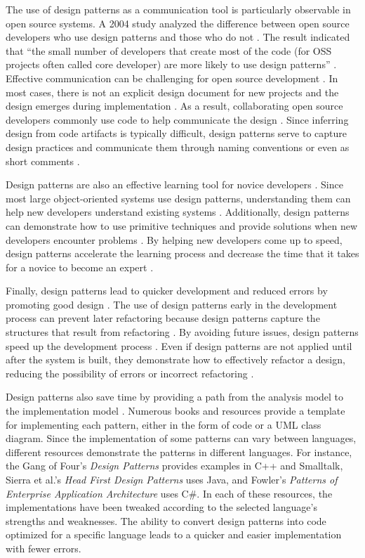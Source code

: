 \documentclass[11pt]{article}
\begin{document}
The use of design patterns as a communication tool is particularly observable in open source systems. A 2004 study analyzed the difference between open source developers who use design patterns and those who do not \cite{hahsler2004}. The result indicated that ``the small number of developers that create most of the code (for OSS projects often called core developer) are more likely to use design patterns'' \cite{hahsler2004}. Effective communication can be challenging for open source development \cite{hahsler2004}. In most cases, there is not an explicit design document for new projects and the design emerges during implementation \cite{hahsler2004}. As a result, collaborating open source developers commonly use code to help communicate the design \cite{hahsler2004}. Since inferring design from code artifacts is typically difficult, design patterns serve to capture design practices and communicate them through naming conventions or even as short comments \cite{hahsler2004}.

	Design patterns are also an effective learning tool for novice developers \cite{doty}. Since most large object-oriented systems use design patterns, understanding them can help new developers understand existing systems \cite{doty}. Additionally, design patterns can demonstrate how to use primitive techniques and provide solutions when new developers encounter problems \cite{doty}. By helping new developers come up to speed, design patterns accelerate the learning process and decrease the time that it takes for a novice to become an expert \cite{doty}.

	Finally, design patterns lead to quicker development and reduced errors by promoting good design \cite{clarke2016}. The use of design patterns early in the development process can prevent later refactoring because design patterns capture the structures that result from refactoring \cite{clarke2016}. By avoiding future issues, design patterns speed up the development process \cite{clarke2016}. Even if design patterns are not applied until after the system is built, they demonstrate how to effectively refactor a design, reducing the possibility of errors or incorrect refactoring \cite{clarke2016}. 

	Design patterns also save time by providing a path from the analysis model to the implementation model \cite{clarke2016}. Numerous books and resources provide a template for implementing each pattern, either in the form of code or a UML class diagram. Since the implementation of some patterns can vary between languages, different resources demonstrate the patterns in different languages. For instance, the Gang of Four's \textit{Design Patterns} provides examples in C++ and Smalltalk, Sierra et al.'s \textit{Head First Design Patterns} uses Java, and Fowler's \textit{Patterns of Enterprise Application Architecture} uses C\#. In each of these resources, the implementations have been tweaked according to the selected language's strengths and weaknesses. The ability to convert design patterns into code optimized for a specific language leads to a quicker and easier implementation with fewer errors.
\end{document}
